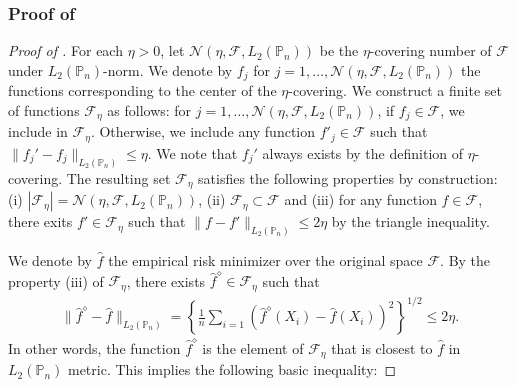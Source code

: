 \documentclass[12pt]{article}
\begin{document}
\begin{appendices}
\subsubsection{Proof of }
\begin{proof}[Proof of ]
For each $\eta > 0$, let $\mathcal{N}(\eta, \mathcal{F}, L_2(\mathbb{P}_n))$ be the $\eta$-covering number of $\mathcal{F}$ under $L_2(\mathbb{P}_n)$-norm. We denote by $f_j$ for $j = 1, \ldots, \mathcal{N}(\eta, \mathcal{F}, L_2(\mathbb{P}_n))$ the functions corresponding to the center of the $\eta$-covering. We construct a finite set of functions $\mathcal{F}_\eta$ as follows: for $j=1, \ldots, \mathcal{N}(\eta, \mathcal{F}, L_2(\mathbb{P}_n))$, if $f_j \in \mathcal{F}$, we include in $\mathcal{F}_\eta$. Otherwise, we include any function $f'_j \in \mathcal{F}$ such that $\|f_j'-f_j\|_{L_2(\mathbb{P}_n)} \le \eta$. We note that $f_j'$ always exists by the definition of $\eta$-covering. The resulting set $\mathcal{F}_\eta$ satisfies the following properties by construction: (i) $|\mathcal{F}_\eta|=\mathcal{N}(\eta, \mathcal{F}, L_2(\mathbb{P}_n))$, (ii) $\mathcal{F}_\eta \subset \mathcal{F}$ and (iii) for any function $f\in\mathcal{F}$, there exits $f' \in \mathcal{F}_\eta$ such that $\|f-f'\|_{L_2(\mathbb{P}_n)}\le 2\eta$ by the triangle inequality. 

We denote by $\widehat {f}$ the empirical risk minimizer over the original space $\mathcal{F}$.
	By the property (iii) of $\mathcal{F}_\eta$, there exists $\widehat f^\diamond \in \mathcal{F}_\eta$ such that 
	\begin{align}
		\| \widehat f^\diamond - \widehat f \|_{L_2(\mathbb{P}_n)} = \left\{\frac{1}{n}\sum_{i=1}(\widehat f^\diamond(X_i) - \widehat f(X_i))^2\right\}^{1/2} \le 2\eta.\nonumber
	\end{align}   
In other words, the function $\widehat f^\diamond$ is the element of $\mathcal{F}_\eta$ that is closest to $\widehat f$ in $L_2(\mathbb{P}_n)$ metric. This implies the following basic inequality:


\end{proof}
\end{appendices}
\end{document}
